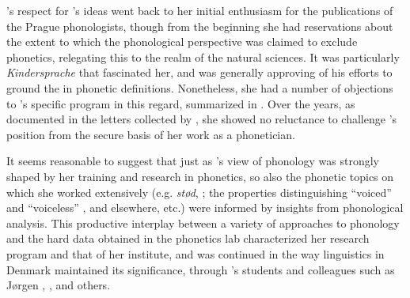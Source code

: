 {\Eli}'s respect for {\Jakobson}'s ideas went back to her initial enthusiasm
for the publications of the Prague phonologists, though from the
beginning she had reservations about the extent to which the
phonological perspective was claimed to exclude phonetics, relegating
this to the realm of the natural sciences. It was particularly
 \textsl{Kindersprache} that
fascinated her, and {\Eli} was generally approving of his efforts to
ground the  in phonetic definitions. Nonetheless,
she had a number of objections to {\Jakobson}'s specific program in this
regard, summarized in
\citealt[162ff.]{fischer-jorgensen75:trends}. Over the years, as
documented in the letters collected by
\citet{early.years:efj-rj.letters}, she showed no reluctance to
challenge {\Jakobson}'s position from the secure basis of her work as a
phonetician.

It seems reasonable to suggest that just as {\Eli}'s view of phonology
was strongly shaped by her training and research in phonetics, so also
the phonetic topics on which she worked extensively (e.g. 
\emph{stød}, \citealt{efj87:stod}; the properties distinguishing
``voiced'' and ``voiceless'' , \citealt{efj68:stops} and
elsewhere, etc.) were informed by insights from phonological
analysis. This productive interplay between a variety of approaches to
phonology and the hard data obtained in the phonetics lab
characterized her research program and that of her institute, and was
continued in the way linguistics in Denmark maintained its
significance, through {\Eli}'s students and colleagues such as Jørgen
{\Rischel}, ,  and others.

